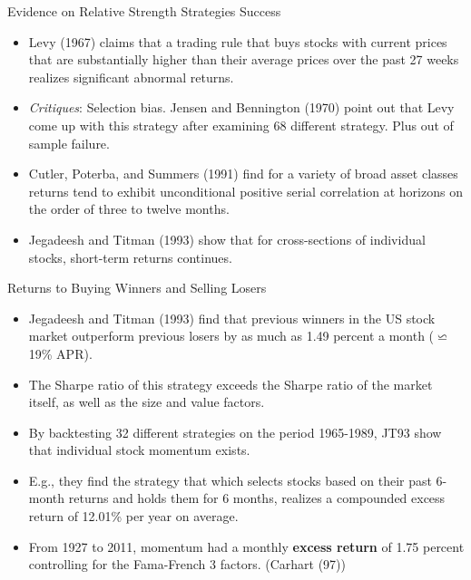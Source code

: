 \documentclass{beamer}
\begin{document}
\begin{frame}{Evidence on Relative Strength Strategies Success}
    \begin{itemize}
        \item Levy (1967) claims that a trading rule that buys stocks with current prices that are substantially higher than their average prices over the past 27 weeks realizes significant abnormal returns.
        \item \textit{Critiques}: Selection bias. Jensen and Bennington (1970) point out that Levy come up with this strategy after examining 68 different strategy. Plus out of sample failure.
        \item Cutler, Poterba, and Summers (1991) find for a variety of broad asset classes returns tend to exhibit unconditional positive serial correlation at horizons on the order of three to twelve months.
        \item Jegadeesh and Titman (1993) show that for cross-sections of individual stocks, short-term returns continues.
    \end{itemize}
\end{frame}

\begin{frame}{Returns to Buying Winners and Selling Losers}
    \begin{itemize}
        \item Jegadeesh and Titman (1993) find that previous winners in the US stock market outperform previous losers by as much as 1.49 percent a month (\(\backsimeq\) 19\% APR).
        \item The Sharpe ratio of this strategy exceeds the Sharpe ratio of the market itself, as well as the size and value factors.
        \item By backtesting 32 different strategies on the period 1965-1989, JT93 show that individual stock momentum exists.
        \item E.g., they find the strategy that which selects stocks based on their past 6-month returns and holds them for 6 months, realizes a compounded excess return of 12.01\% per year on average.
        \item From 1927 to 2011, momentum had a monthly \textbf{excess return} of 1.75 percent controlling for the Fama-French 3 factors. (Carhart (97))
    \end{itemize}
\end{frame}
\end{document}
